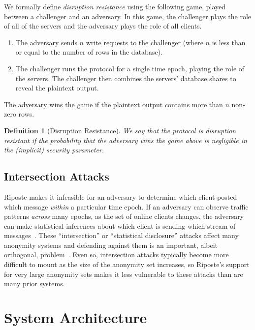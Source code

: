 \documentclass[10pt,twocolumn]{article}
\newtheorem{defn}{Definition}
\newcommand{\name}{Riposte\xspace}
\newcommand{\Name}{Riposte\xspace}
\begin{document}
We formally define {\em disruption resistance} using
the following game, played between a challenger
and an adversary.
In this game, the challenger plays the role of
all of the servers and the adversary plays the 
role of all clients.
\begin{enumerate}
  \item The adversary sends $n$ write requests
    to the challenger
    (where $n$ is less than or equal to the number of 
    rows in the database).
  \item The challenger runs the protocol for
    a single time epoch, playing the role of the servers.
    The challenger then combines the servers' database
    shares to reveal the plaintext output.
\end{enumerate}

The adversary wins the game if the plaintext
output contains more than $n$ non-zero rows. 

\begin{defn}[Disruption Resistance]
We say that the protocol is {\em disruption resistant}
if the probability that the adversary wins the game
above is negligible in the (implicit) security parameter.
\end{defn}

\subsection{Intersection Attacks}

\Name makes it infeasible for an adversary to determine
which client posted which message {\em within} a particular time epoch.
If an adversary can observe traffic patterns {\em across} many
epochs, as the set of online clients changes, the adversary can
make statistical inferences about which client is sending 
which stream of 
messages~\cite{danezis2004statistical,kedogan2003limits,mathewson2005practical}.
These ``intersection'' or ``statistical disclosure'' attacks
affect many anonymity systems and defending against them is an important,
albeit orthogonal, problem~\cite{mathewson2005practical,wolinsky2013hang}.
Even so, intersection attacks typically become more difficult to
mount as the size of the anonymity set increases, so \name's support for
very large anonymity sets makes it less vulnerable to these attacks than 
are many prior systems. 


 \section{System Architecture}
\label{sec:arch}
\end{document}

